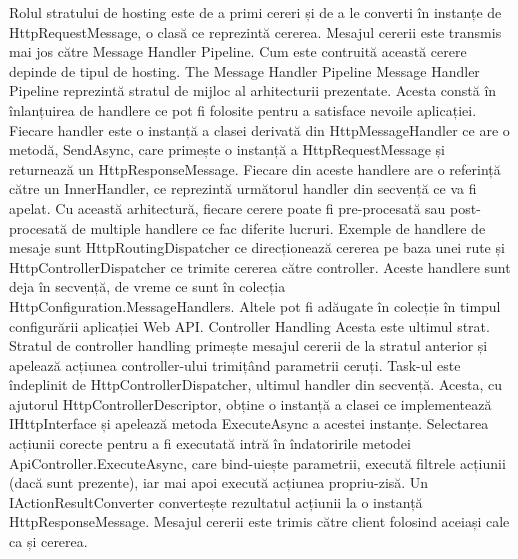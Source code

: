 Rolul stratului de hosting este de a primi cereri și de a le converti în instanțe de HttpRequestMessage, o clasă ce reprezintă cererea. Mesajul cererii este transmis mai jos către Message Handler Pipeline. Cum este contruită această cerere depinde de tipul de hosting.
The Message Handler Pipeline
Message Handler Pipeline reprezintă stratul de mijloc al arhitecturii prezentate. Acesta constă în înlanțuirea  de handlere ce pot fi folosite pentru a satisface nevoile aplicației. Fiecare handler este o instanță a clasei derivată din HttpMessageHandler ce are o metodă, SendAsync, care primește o instanță a HttpRequestMessage și returnează un HttpResponseMessage.
Fiecare din aceste handlere are o referință către un InnerHandler, ce reprezintă următorul handler din secvență ce va fi apelat.
Cu această arhitectură, fiecare cerere poate fi pre-procesată sau post-procesată de multiple handlere ce fac diferite lucruri.
Exemple de handlere de mesaje sunt HttpRoutingDispatcher ce direcționează cererea pe baza unei rute și HttpControllerDispatcher ce trimite cererea către controller.
Aceste handlere sunt deja în secvență, de vreme ce sunt în colecția HttpConfiguration.MessageHandlers. Altele pot fi adăugate în colecție în timpul configurării aplicației Web API.
Controller Handling
Acesta este ultimul strat. Stratul de controller handling primește mesajul cererii de la stratul anterior și apelează acțiunea controller-ului trimițând parametrii ceruți. Task-ul este îndeplinit de HttpControllerDispatcher, ultimul handler din secvență. Acesta, cu ajutorul HttpControllerDescriptor, obține o instanță a clasei ce implementează IHttpInterface și apelează metoda ExecuteAsync a acestei instanțe. Selectarea acțiunii corecte pentru a fi executată intră în îndatoririle metodei ApiController.ExecuteAsync, care bind-uiește parametrii, execută filtrele acțiunii (dacă sunt prezente), iar mai apoi execută acțiunea propriu-zisă.
Un IActionResultConverter convertește rezultatul acțiunii la o instanță HttpResponseMessage. Mesajul cererii este trimis către client folosind aceiași cale ca și cererea.
 


 

